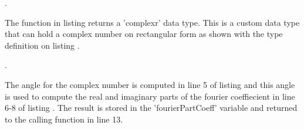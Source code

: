 . 

The function in listing  returns a 'complexr' data type. This is a custom data type that can hold a complex number on rectangular form as shown with the type definition on listing .

. 

The angle for the complex number is computed in line 5 of listing  and this angle is used to compute the real and imaginary parts of the fourier coeffiecient in line 6-8 of listing . The result is stored in the 'fourierPartCoeff' variable and returned to the calling function in line 13.

